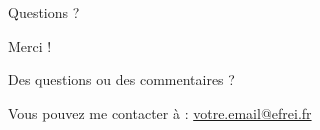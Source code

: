 \documentclass[aspectratio=169]{beamer}
\begin{document}
\begin{frame}{Questions ?}
    \begin{center}
        {\Huge\calligra Merci !}

        \vspace{1cm}

        \Large{Des questions ou des commentaires ?}

        \vspace{0.5cm}

        \small{Vous pouvez me contacter à : \href{mailto:votre.email@efrei.fr}{votre.email@efrei.fr}}
    \end{center}
\end{frame}
\end{document}
